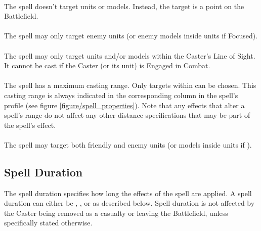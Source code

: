 \paragraph{\ground}

The spell doesn't target units or models. Instead, the target is a point on the Battlefield.

\paragraph{\hex}

The spell may only target enemy units (or enemy models inside units if Focused).

\paragraph{\missile}

The spell may only target units and/or models within the Caster's Line of Sight. It cannot be cast if the Caster (or its unit) is Engaged in Combat.

\paragraph{}

The spell has a maximum casting range. Only targets within  can be chosen. This casting range is always indicated in the corresponding column in the spell's profile (see figure \ref{figure/spell_properties}). Note that any effects that alter a spell's range do not affect any other distance specifications that may be part of the spell's effect.

\paragraph{\universal}

The spell may target both friendly and enemy units (or models inside units if \focused{}).

\subsection{Spell Duration}

The spell duration specifies how long the effects of the spell are applied. A spell duration can either be \instant{}, \oneturn{}, or \permanent{} as described below. Spell duration is not affected by the Caster being removed as a casualty or leaving the Battlefield, unless specifically stated otherwise.


